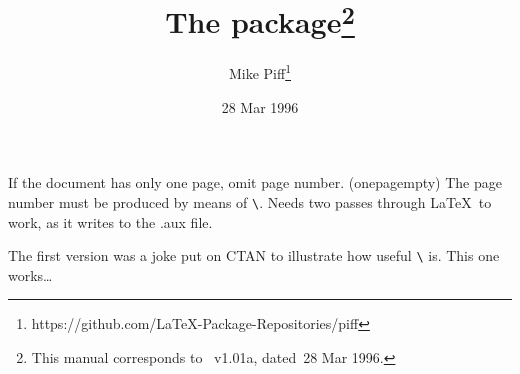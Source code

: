 \documentclass[pagesize=auto, DIV=10, fontsize=14pt, parskip=full]{scrartcl}
\title{The \pkg{onepagem} package\thanks{This manual corresponds to \pkg{onepagem.sty}~v1.01a, dated~28 Mar 1996.}}
\author{Mike Piff\thanks{https://github.com/LaTeX-Package-Repositories/piff}}
\date{28 Mar 1996}
\makeatletter
\newcommand*{\cs}[1]{\texttt{\textbackslash#1}}
\newcommand*{\cmd}[1]{\cs{\expandafter\@gobble\string#1}}
\makeatother
\begin{document}
\maketitle

If the document has only one page, omit page number. (onepagempty)
The page number must be produced by means of \cmd{\thepage}.
Needs two passes through \LaTeX\ to work, as it writes to the {\ttfamily .aux} file.

The first version was a joke put on CTAN to illustrate how useful
\cmd{\AtEndDocument} is.  This one works\dots
\end{document}
